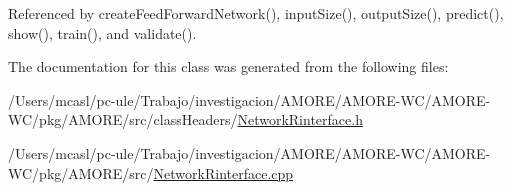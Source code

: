 Referenced by createFeedForwardNetwork(), inputSize(), outputSize(), predict(), show(), train(), and validate().



The documentation for this class was generated from the following files:\begin{DoxyCompactItemize}
\item 
/Users/mcasl/pc-\/ule/Trabajo/investigacion/AMORE/AMORE-\/WC/AMORE-\/WC/pkg/AMORE/src/classHeaders/\hyperlink{_network_rinterface_8h}{NetworkRinterface.h}\item 
/Users/mcasl/pc-\/ule/Trabajo/investigacion/AMORE/AMORE-\/WC/AMORE-\/WC/pkg/AMORE/src/\hyperlink{_network_rinterface_8cpp}{NetworkRinterface.cpp}\end{DoxyCompactItemize}
